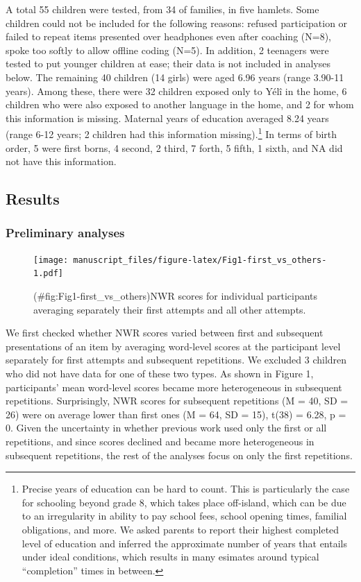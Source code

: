 \documentclass[english,,man,floatsintext]{apa6}
\begin{document}
A total 55 children were tested, from 34 of families, in five hamlets. Some children could not be included for the following reasons: refused participation or failed to repeat items presented over headphones even after coaching (N=8), spoke too softly to allow offline coding (N=5). In addition, 2 teenagers were tested to put younger children at ease; their data is not included in analyses below. The remaining 40 children (14 girls) were aged 6.96 years (range 3.90-11 years). Among these, there were 32 children exposed only to Yélî in the home, 6 children who were also exposed to another language in the home, and 2 for whom this information is missing. Maternal years of education averaged 8.24 years (range 6-12 years; 2 children had this information missing).\footnote{Precise years of education can be hard to count. This is particularly the case for schooling beyond grade 8, which takes place off-island, which can be due to an irregularity in ability to pay school fees, school opening times, familial obligations, and more. We asked parents to report their highest completed level of education and inferred the approximate number of years that entails under ideal conditions, which results in many esimates around typical ``completion'' times in between.} In terms of birth order, 5 were first borns, 4 second, 2 third, 7 forth, 5 fifth, 1 sixth, and NA did not have this information.

\hypertarget{results}{%
\subsection{Results}\label{results}}

\hypertarget{preliminary-analyses}{%
\subsubsection{Preliminary analyses}\label{preliminary-analyses}}

\begin{figure}
\centering
\texttt{[image: manuscript\_files/figure-latex/Fig1-first\_vs\_others-1.pdf]}
\caption{(\#fig:Fig1-first\_vs\_others)NWR scores for individual participants averaging separately their first attempts and all other attempts.}
\end{figure}

We first checked whether NWR scores varied between first and subsequent presentations of an item by averaging word-level scores at the participant level separately for first attempts and subsequent repetitions. We excluded 3 children who did not have data for one of these two types. As shown in Figure 1, participants' mean word-level scores became more heterogeneous in subsequent repetitions. Surprisingly, NWR scores for subsequent repetitions (M = 40, SD = 26)
were on average lower than first ones (M = 64, SD = 15), t(38) = 6.28, p = 0. Given the uncertainty in whether previous work used only the first or all repetitions, and since scores declined and became more heterogeneous in subsequent repetitions, the rest of the analyses focus on only the first repetitions.
\end{document}

